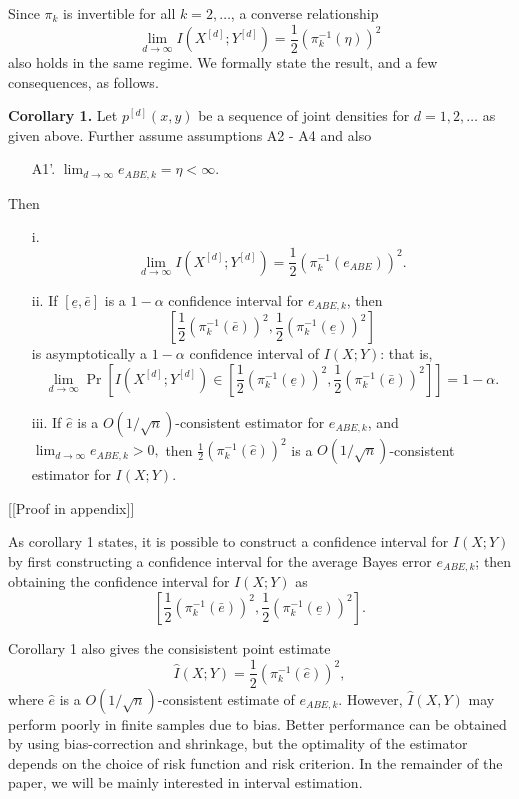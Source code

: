 \documentclass{article}
\begin{document}
Since $\pi_k$ is invertible for all $k = 2, \hdots$,
a converse relationship
\[
\lim_{d \to \infty} I(X^{[d]}; Y^{[d]}) = \frac{1}{2}(\pi_k^{-1}(\eta))^2
\]
also holds in the same regime.  We formally state the result, and a few consequences, as follows.

\textbf{Corollary 1.}
Let $p^{[d]}(x, y)$ be a sequence of joint densities
for $d = 1,2,\hdots$ as given above.  Further assume assumptions A2 - A4 and also
\begin{itemize}
\item[A1'.] $\lim_{d \to \infty} e_{ABE, k} = \eta < \infty.$
\end{itemize}
Then
\begin{itemize}
\item[i.]
\[
\lim_{d \to \infty} I(X^{[d]}; Y^{[d]}) = \frac{1}{2}(\pi_k^{-1}(e_{ABE}))^2.
\]
\item[ii.]
If $[\underline{e}, \bar{e}]$ is a $1-\alpha$ confidence interval for $e_{ABE, k}$,
then
\[
[\frac{1}{2}(\pi_k^{-1}(\bar{e}))^2, \frac{1}{2}(\pi_k^{-1}(\underline{e}))^2]
\]
is asymptotically a $1-\alpha$ confidence interval of $I(X; Y)$: that is,
\[
\lim_{d \to \infty} \Pr\left[I(X^{[d]}; Y^{[d]}) \in [\frac{1}{2}(\pi_k^{-1}(\underline{e}))^2, \frac{1}{2}(\pi_k^{-1}(\bar{e}))^2]\right] = 1-\alpha.
\]
\item[iii.] If $\hat{e}$ is a $O(1/\sqrt{n})$-consistent estimator for $e_{ABE, k}$,
and $\lim_{d \to \infty} e_{ABE, k} > 0,$
then $\frac{1}{2}(\pi_k^{-1}(\hat{e}))^2$ is a $O(1/\sqrt{n})$-consistent estimator for $I(X; Y)$.
\end{itemize}

[[Proof in appendix]]

As corollary 1 states, it is possible to construct a confidence interval for $I(X; Y)$ by
first constructing a confidence interval for the average Bayes error $e_{ABE,
k}$; then obtaining the confidence interval for $I(X; Y)$ as
\[
[\frac{1}{2}(\pi_k^{-1}(\bar{e}))^2, \frac{1}{2}(\pi_k^{-1}(\underline{e}))^2].
\]

Corollary 1 also gives the consisistent point estimate
\[\hat{I}(X; Y) = \frac{1}{2}(\pi_k^{-1}(\hat{e}))^2,\]
where $\hat{e}$ is a $O(1/\sqrt{n})$-consistent estimate of $e_{ABE,
k}.$ However, $\hat{I}(X, Y)$ may perform poorly in finite samples due
to bias.  Better performance can be obtained by using bias-correction
and shrinkage, but the optimality of the estimator depends on the
choice of risk function and risk criterion.  In the remainder
of the paper, we will be mainly interested in interval estimation.
\end{document}

